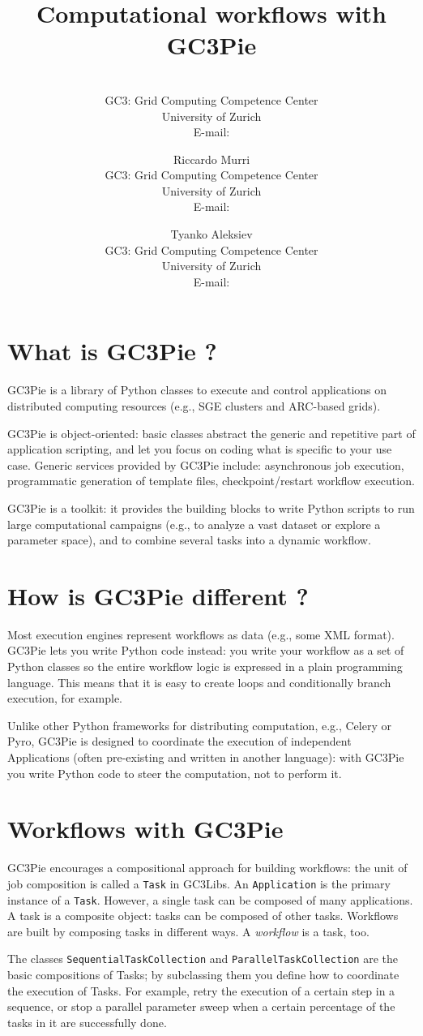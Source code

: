 \documentclass{PoS}
\title{Computational workflows with GC3Pie}
\author{\speaker{Sergio MAFFIOLETTI}\\
        GC3: Grid Computing Competence Center\\
        University of Zurich \\
         E-mail: \email{sergio.maffioletti@gc3.uzh.ch}}
\author{Riccardo Murri\\
        GC3: Grid Computing Competence Center\\
        University of Zurich \\
        E-mail: \email{riccardo.murri@gmail.com}}
\author{Tyanko Aleksiev\\
        GC3: Grid Computing Competence Center\\
        University of Zurich \\
        E-mail: \email{tyanko.aleksiev@gmail.com}}
\begin{document}
\section{What is GC3Pie ?}
GC3Pie is a library of Python classes to execute and control
applications on distributed computing resources (e.g., SGE clusters
and ARC-based grids).
 
GC3Pie is object-oriented: basic classes abstract the generic and
repetitive part of application scripting, and let you focus on coding
what is specific to your use case. Generic services provided by GC3Pie
include: asynchronous job execution, programmatic generation of
template files, checkpoint/restart workflow execution.

GC3Pie is a toolkit: it provides the building blocks to write Python
scripts to run large computational campaigns (e.g., to analyze a vast
dataset or explore a parameter space), and to combine several tasks
into a dynamic workflow.

\section{How is GC3Pie different ?}
Most execution engines represent workflows as data (e.g., some XML
format). GC3Pie lets you write Python code instead: you write your
workflow as a set of Python classes so the entire workflow logic is
expressed in a plain programming language. This means that it is easy
to create loops and conditionally branch execution, for example.
 
Unlike other Python frameworks for distributing computation, e.g.,
Celery or Pyro, GC3Pie is designed to coordinate the execution of
independent Applications (often pre-existing and written in another
language): with GC3Pie you write Python code to steer the computation,
not to perform it. 

\section{Workflows with GC3Pie}
GC3Pie encourages a compositional approach for building workflows: the
unit of job composition is called a \texttt{Task} in GC3Libs. An
\texttt{Application} is the primary instance of a
\texttt{Task}. However, a single task can be composed of many
applications. A task is a composite object: tasks can be composed of
other tasks. Workflows are built by composing tasks in different
ways. A \emph{workflow} is a task, too.

The classes \texttt{SequentialTaskCollection} and
\texttt{ParallelTaskCollection} are the basic compositions of Tasks; by
subclassing them you define how to coordinate the execution of
Tasks. For example, retry the execution of a certain step in a
sequence, or stop a parallel parameter sweep when a certain percentage
of the tasks in it are successfully done. 
 
\end{document}
